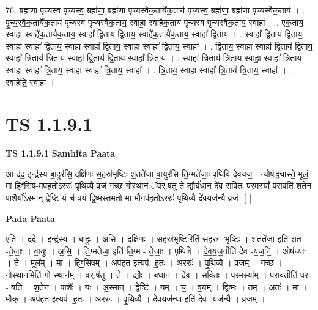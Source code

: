 \documentclass[17pt]{extarticle}
\begin{document}
76. ब्रह्म॑णा पृच्यस्व पृच्यस्व॒ ब्रह्म॑णा॒ ब्रह्म॑णा पृच्यस्वैक॒तायै॑क॒ताय॑ पृच्यस्व॒ ब्रह्म॑णा॒ ब्रह्म॑णा पृच्यस्वैक॒ताय॑ । . पृ॒च्य॒स्वै॒क॒तायै॑क॒ताय॑ पृच्यस्व पृच्यस्वैक॒ताय॒ स्वाहा॒ स्वाहै॑क॒ताय॑ पृच्यस्व पृच्यस्वैक॒ताय॒ स्वाहा᳚ । . ए॒क॒ताय॒ स्वाहा॒ स्वाहै॑क॒तायै॑क॒ताय॒ स्वाहा᳚ द्वि॒ताय॑ द्वि॒ताय॒ स्वाहै॑क॒तायै॑क॒ताय॒ स्वाहा᳚ द्वि॒ताय॑ । . स्वाहा᳚ द्वि॒ताय॑ द्वि॒ताय॒ स्वाहा॒ स्वाहा᳚ द्वि॒ताय॒ स्वाहा॒ स्वाहा᳚ द्वि॒ताय॒ स्वाहा॒ स्वाहा᳚ द्वि॒ताय॒ स्वाहा᳚ । . द्वि॒ताय॒ स्वाहा॒ स्वाहा᳚ द्वि॒ताय॑ द्वि॒ताय॒ स्वाहा᳚ त्रि॒ताय॑ त्रि॒ताय॒ स्वाहा᳚ द्वि॒ताय॑ द्वि॒ताय॒ स्वाहा᳚ त्रि॒ताय॑ । . स्वाहा᳚ त्रि॒ताय॑ त्रि॒ताय॒ स्वाहा॒ स्वाहा᳚ त्रि॒ताय॒ स्वाहा॒ स्वाहा᳚ त्रि॒ताय॒ स्वाहा॒ स्वाहा᳚ त्रि॒ताय॒ स्वाहा᳚ । . त्रि॒ताय॒ स्वाहा॒ स्वाहा᳚ त्रि॒ताय॑ त्रि॒ताय॒ स्वाहा᳚ । . स्वाहेति॒ स्वाहा᳚ । \newline
\pagebreak
{}

\section{ TS 1.1.9.1 }

\textbf{TS 1.1.9.1 } \newline
\textbf{Samhita Paata} \newline

आ द॑द॒ इन्द्र॑स्य बा॒हुर॑सि॒ दक्षि॑णः स॒हस्र॑भृष्टिः श॒तते॑जा वा॒युर॑सि ति॒ग्मते॑जाः॒ पृथि॑वि देवयज॒ - न्योष॑द्ध्यास्ते॒ मूलं॒ मा हिꣳ॑सिष॒-मप॑हतो॒ऽररुः॑ पृथि॒व्यै व्र॒जं ग॑च्छ गो॒स्थानं॒ ॅवर्.ष॑तु ते॒ द्यौर्ब॑धा॒न दे॑व सवितः पर॒मस्यां᳚ परा॒वति॑ श॒तेन॒ पाशै॒र्यो᳚ऽस्मान् द्वेष्टि॒ यं च॑ व॒यं द्वि॒ष्मस्तमतो॒ मा मौ॒गप॑हतो॒ऽररुः॑ पृथि॒व्यै दे॑व॒यज॑न्यै व्र॒जं -[ ] \newline

\textbf{Pada Paata} \newline

एति॑ । द॒दे॒ । इन्द्र॑स्य । बा॒हुः । अ॒सि॒ । दक्षि॑णः । स॒हस्र॑भृष्टि॒रिति॑ स॒हस्र॑ -भृ॒ष्टिः॒ । श॒तते॑जा॒ इति॑ श॒त -ते॒जाः॒ । वा॒युः । अ॒सि॒ । ति॒ग्मते॑जा॒ इति॑ ति॒ग्म - ते॒जाः॒ । पृथि॑वि । दे॒व॒य॒ज॒नीति॑ देव -य॒ज॒नि॒ । ओष॑ध्याः । ते॒ । मूल᳚म् । मा । हिꣳ॒॒सि॒ष॒म् । अप॑हत॒ इत्यप॑ -ह॒तः॒ । अ॒ररुः॑ । पृ॒थि॒व्यै । व्र॒जम् । ग॒च्छ॒ । गो॒स्थान॒मिति॑ गो-स्थान᳚म् । वर्.ष॑तु । ते॒ । द्यौः । ब॒धा॒न । दे॒व॒ । स॒वि॒तः॒ । प॒र॒मस्या᳚म् । प॒रा॒वतीति॑ परा - वति॑ । श॒तेन॑ । पाशैः᳚ । यः । अ॒स्मान् । द्वेष्टि॑ । यम् । च॒ । व॒यम् । द्वि॒ष्मः । तम् । अतः॑ । मा । मौ॒क् । अप॑हत॒ इत्यप॑ -ह॒तः॒ । अ॒ररुः॑ । पृ॒थि॒व्यै । दे॒व॒यज॑न्या॒ इति॑ देव -यज॑न्यै । व्र॒जम् ।  \newline
\end{document}
